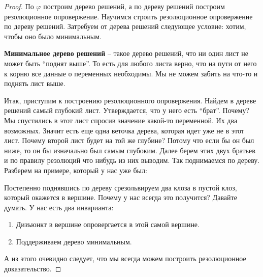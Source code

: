\begin{proof} \quad

    По $\varphi$ построим дерево решений, а по дереву решений построим резолюционное опровержение. 
    Научимся строить резолюционное опровержение по дереву решений. Затребуем от дерева решений следующее условие: хотим, чтобы оно было минимальным. 
    \begin{conj}
        \textbf{Минимальное дерево решений} -- такое дерево решений, что ни один лист не может быть ``поднят выше''. То есть для любого листа верно, что на пути от него к корню все данные о переменных необходимы. 
        Мы не можем забить на что-то и поднять лист выше. 
    \end{conj}
    Итак, приступим к построению резолюционного опровержения. Найдем в дереве решений самый глубокий лист. Утверждается, что у него есть ``брат''. Почему? 
    Мы спустились в этот лист спросив значение какой-то переменной. Их два возможных. Значит есть еще одна веточка дерева, которая идет уже не в этот лист. Почему второй лист 
    будет на той же глубине? Потому что если бы он был ниже, то он бы изначально был самым глубоким. 
    Далее берем этих двух братьев и по правилу резолюций что нибудь из них выводим. Так поднимаемся по дереву. Разберем на примере, который у нас уже был: 
    \begin{center}
    \end{center}
    Постепенно поднявшись по дереву срезольвируем два клоза в пустой клоз, который окажется в вершине.
    Почему у нас всегда это получится? Давайте думать. У нас есть два инварианта:
    \begin{enumerate}
        \item Дизъюнкт в вершине опровергается в этой самой вершине. 
        \item Поддерживаем дерево минимальным. 
    \end{enumerate} 
    А из этого очевидно следует, что мы всегда можем построить резолюционное доказательство. 
\end{proof}
